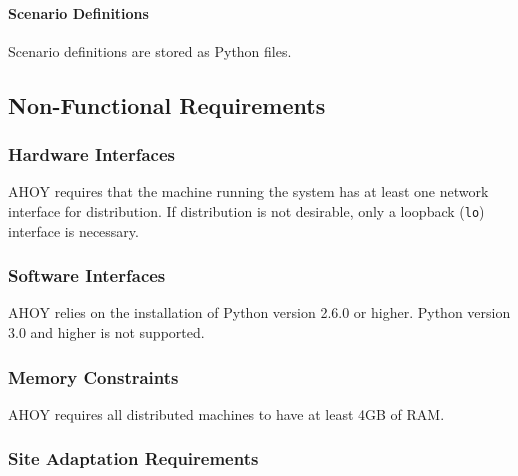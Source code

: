\documentclass[titlepage]{article}
\newcommand{\cbox}[0]{
    \CheckBox[height=5pt,width=5pt]{}
}
\begin{document}
\begin{Form}
    \paragraph{Scenario Definitions} Scenario definitions are stored as Python files.\cbox


\subsection{Non-Functional Requirements} 

\subsubsection{Hardware Interfaces%
  \label{hardware-interfaces}%
}

AHOY requires that the machine running the system has at least one network interface for distribution.  If distribution is not desirable, only a loopback (\texttt{lo}) interface is necessary.\cbox

\subsubsection{Software Interfaces%
  \label{software-interfaces}%
}

AHOY relies on the installation of Python version 2.6.0 or higher.  Python version 3.0 and higher is not supported.\cbox


\subsubsection{Memory Constraints%
  \label{memory-constraints}%
}

AHOY requires all distributed machines to have at least 4GB of RAM.\cbox


\subsubsection{Site Adaptation Requirements%
  \label{site-adaptation-requirements}%
}


\end{Form}
\end{document}
